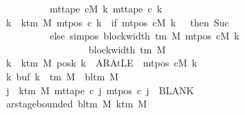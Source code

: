 \begin{isabellebody}
\ \ \ \ \ \ \ \ \ \ \ \ \ \ \ \ \ \ \ \ \ \ \ \ \ \ {\isacharparenleft}{\kern0pt}mt{\isacharunderscore}{\kern0pt}tape\ cM\ k{\isacharparenright}{\kern0pt}\ {\isacharparenleft}{\kern0pt}mt{\isacharunderscore}{\kern0pt}tape\ c{}\ k{\isacharparenright}{\kern0pt}{\isacharsemicolon}{\kern0pt}\isanewline
\ \ \ \ \ \ \ \ \ \ \ \ \ \ \ \ \ {\isasymforall}k\ {\isacharless}{\kern0pt}\ k{\isacharunderscore}{\kern0pt}tm\ M{\isachardot}{\kern0pt}\ mt{\isacharunderscore}{\kern0pt}pos\ c{}\ k\ {\isacharequal}{\kern0pt}\ {\isacharparenleft}{\kern0pt}if\ mt{\isacharunderscore}{\kern0pt}pos\ cM\ k\ {\isacharequal}{\kern0pt}\ {}\ then\ Suc\ {}\isanewline
\ \ \ \ \ \ \ \ \ \ \ \ \ \ \ \ \ \ \ \ \ \ \ \ \ \ else\ sim{\isacharunderscore}{\kern0pt}pos\ {\isacharparenleft}{\kern0pt}block{\isacharunderscore}{\kern0pt}width\ {\isacharparenleft}{\kern0pt}{\isasymGamma}{\isacharunderscore}{\kern0pt}tm\ M{\isacharparenright}{\kern0pt}{\isacharparenright}{\kern0pt}\ {\isacharparenleft}{\kern0pt}mt{\isacharunderscore}{\kern0pt}pos\ cM\ k{\isacharparenright}{\kern0pt}\isanewline
\ \ \ \ \ \ \ \ \ \ \ \ \ \ \ \ \ \ \ \ \ \ \ \ \ \ \ \ \ \ \ \ \ {\isacharplus}{\kern0pt}\ block{\isacharunderscore}{\kern0pt}width\ {\isacharparenleft}{\kern0pt}{\isasymGamma}{\isacharunderscore}{\kern0pt}tm\ M{\isacharparenright}{\kern0pt}{\isacharparenright}{\kern0pt}{\isacharsemicolon}{\kern0pt}\isanewline
\ \ \ \ \ \ \ \ \ \ \ \ \ \ \ \ \ {\isasymforall}k\ {\isacharless}{\kern0pt}\ k{\isacharunderscore}{\kern0pt}tm\ M{\isachardot}{\kern0pt}\ posk\ k\ {\isacharequal}{\kern0pt}\ AR{\isacharunderscore}{\kern0pt}AtLE\ {\isasymlongleftrightarrow}\ mt{\isacharunderscore}{\kern0pt}pos\ cM\ k\ {\isacharequal}{\kern0pt}\ {}{\isacharsemicolon}{\kern0pt}\isanewline
\ \ \ \ \ \ \ \ \ \ \ \ \ \ \ \ \ {\isasymforall}k{\isachardot}{\kern0pt}\ buf\ k\ {\isasymin}\ {\isasymGamma}{\isacharunderscore}{\kern0pt}tm\ M\ {\isasymunion}\ {\isacharbraceleft}{\kern0pt}bl{\isacharunderscore}{\kern0pt}tm\ M{\isacharbraceright}{\kern0pt}{\isacharsemicolon}{\kern0pt}\isanewline
\ \ \ \ \ \ \ \ \ \ \ \ \ \ \ \ \ {\isasymforall}j\ {\isasymge}\ k{\isacharunderscore}{\kern0pt}tm\ M{\isachardot}{\kern0pt}\ mt{\isacharunderscore}{\kern0pt}tape\ c{}\ j\ {\isacharparenleft}{\kern0pt}mt{\isacharunderscore}{\kern0pt}pos\ c{}\ j{\isacharparenright}{\kern0pt}\ {\isacharequal}{\kern0pt}\ BLANK{}{\isacharsemicolon}{\kern0pt}\isanewline
\ \ \ \ \ \ \ \ \ \ \ \ \ \ \ \ \ ar{\isacharunderscore}{\kern0pt}stage{\isacharunderscore}{\kern0pt}bounded\ {\isacharparenleft}{\kern0pt}bl{\isacharunderscore}{\kern0pt}tm\ M{\isacharparenright}{\kern0pt}\ {\isacharparenleft}{\kern0pt}k{\isacharunderscore}{\kern0pt}tm\ M{\isacharparenright}{\kern0pt}\isanewline

\end{isabellebody}
